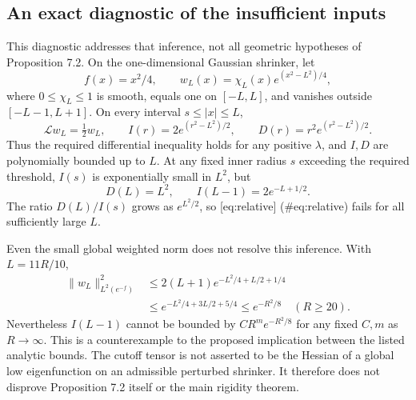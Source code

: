 \documentclass[10pt]{article}
\begin{document}
\subsection*{An exact diagnostic of the insufficient inputs}
This diagnostic addresses that inference, not all geometric hypotheses of Proposition 7.2. On the one-dimensional Gaussian shrinker, let \[f(x)=x^2/4,\qquad
 w_L(x)=\chi_L(x)e^{(x^2-L^2)/4},\] where \(0\le\chi_L\le1\) is smooth, equals one on \([-L,L]\), and vanishes outside \([-L-1,L+1]\). On every interval \(s\le |x|\le L\), \[\mathcal Lw_L=\tfrac12w_L,\qquad
 I(r)=2e^{(r^2-L^2)/2},\qquad
 D(r)=r^2e^{(r^2-L^2)/2}.\] Thus the required differential inequality holds for any positive \(\lambda\), and \(I,D\) are polynomially bounded up to \(L\). At any fixed inner radius \(s\) exceeding the required threshold, \(I(s)\) is exponentially small in \(L^2\), but \[D(L)=L^2,\qquad I(L-1)=2e^{-L+1/2}.\] The ratio \(D(L)/I(s)\) grows as \(e^{L^2/2}\), so [eq:relative] (\#eq:relative) fails for all sufficiently large \(L\).\par
Even the small global weighted norm does not resolve this inference. With \(L=11R/10\), \[\begin{aligned}
 \|w_L\|_{L^2(e^{-f})}^2
 &\le 2(L+1)e^{-L^2/4+L/2+1/4}\\
 &\le e^{-L^2/4+3L/2+5/4}
 \le e^{-R^2/8}\quad(R\ge20).\end{aligned}\] Nevertheless \(I(L-1)\) cannot be bounded by \(CR^m e^{-R^2/8}\) for any fixed \(C,m\) as \(R\to\infty\). This is a counterexample to the proposed implication between the listed analytic bounds. The cutoff tensor is not asserted to be the Hessian of a global low eigenfunction on an admissible perturbed shrinker. It therefore does not disprove Proposition 7.2 itself or the main rigidity theorem.\par
\end{document}
